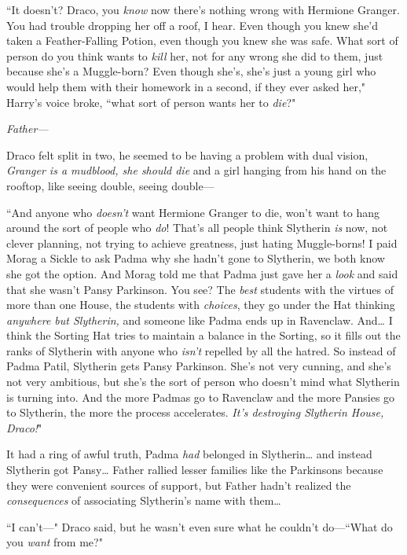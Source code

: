 ``It doesn't? Draco, you \emph{know} now there's nothing wrong with Hermione Granger. You had trouble dropping her off a roof, I hear. Even though you knew she'd taken a Feather-Falling Potion, even though you knew she was safe. What sort of person do you think wants to \emph{kill} her, not for any wrong she did to them, just because she's a Muggle-born? Even though she's, she's just a young girl who would help them with their homework in a second, if they ever asked her," Harry's voice broke, ``what sort of person wants her to \emph{die}?"

\emph{Father—}

Draco felt split in two, he seemed to be having a problem with dual vision, \emph{Granger is a mudblood, she should die} and a girl hanging from his hand on the rooftop, like seeing double, seeing double—

``And anyone who \emph{doesn't} want Hermione Granger to die, won't want to hang around the sort of people who \emph{do}! That's all people think Slytherin \emph{is} now, not clever planning, not trying to achieve greatness, just hating Muggle-borns! I paid Morag a Sickle to ask Padma why she hadn't gone to Slytherin, we both know she got the option. And Morag told me that Padma just gave her a \emph{look} and said that she wasn't Pansy Parkinson. You see? The \emph{best} students with the virtues of more than one House, the students with \emph{choices}, they go under the Hat thinking \emph{anywhere but Slytherin,} and someone like Padma ends up in Ravenclaw. And{\ldots} I think the Sorting Hat tries to maintain a balance in the Sorting, so it fills out the ranks of Slytherin with anyone who \emph{isn't} repelled by all the hatred. So instead of Padma Patil, Slytherin gets Pansy Parkinson. She's not very cunning, and she's not very ambitious, but she's the sort of person who doesn't mind what Slytherin is turning into. And the more Padmas go to Ravenclaw and the more Pansies go to Slytherin, the more the process accelerates. \emph{It's destroying Slytherin House, Draco!}"

It had a ring of awful truth, Padma \emph{had} belonged in Slytherin{\ldots} and instead Slytherin got Pansy{\ldots} Father rallied lesser families like the Parkinsons because they were convenient sources of support, but Father hadn't realized the \emph{consequences} of associating Slytherin's name with them{\ldots}

``I can't—" Draco said, but he wasn't even sure what he couldn't do—``What do you \emph{want} from me?"


